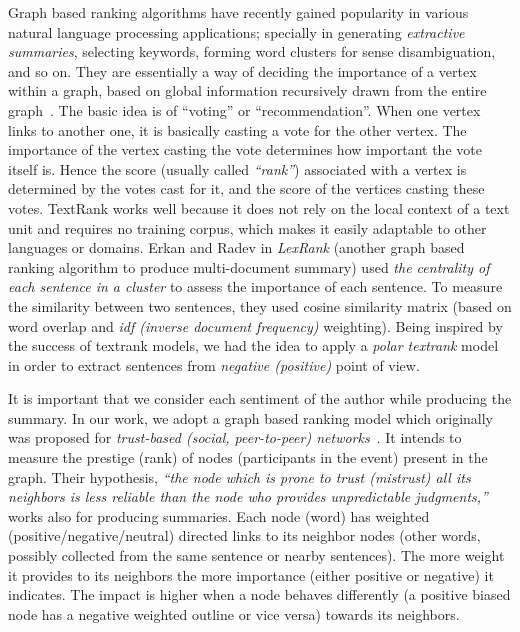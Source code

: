 \documentclass[a4paper]{report}
\begin{document}
\par Graph based ranking algorithms have recently gained popularity in various natural language processing applications; specially in generating {\em extractive summaries}, selecting keywords, forming word clusters for sense disambiguation, and so on. They are essentially a way of deciding the importance of a vertex within a graph, based on global information recursively drawn from the entire graph~\cite{Mihalcea04TextRank}. The basic idea is of ``voting'' or ``recommendation''. When one vertex links to another one, it is basically casting a vote for the other vertex. The importance of the vertex casting the vote determines how important the vote itself is.  Hence the score (usually called {\em ``rank''}) associated with a vertex is determined by the votes cast for it, and the score of the vertices casting these votes. TextRank works well because it does not rely on the local context of a text unit and requires no training corpus, which makes it easily adaptable to other languages or domains. Erkan and Radev \cite{Erkan:2004:LGL:1622487.1622501} in \emph{LexRank} (another graph based ranking algorithm to produce multi-document summary) used \emph{the centrality of each sentence in a cluster} to assess the importance of each sentence. To measure the similarity between two sentences, they used cosine similarity matrix (based on word overlap and {\em idf (inverse document frequency)} weighting). Being inspired by the success of textrank models, we had the idea to apply a {\em polar textrank} model in order to extract sentences from {\em negative (positive)} point of view.
\par It is important that we consider each sentiment of the author while producing the summary. In our work, we adopt a graph based ranking model which originally was proposed for {\em trust-based (social, peer-to-peer) networks}~\cite{Mishra:2011:FBP:1963405.1963485}. It intends to measure the prestige (rank) of nodes (participants in the event) present in the graph. Their hypothesis, {\em ``the node which is prone to trust (mistrust) all its neighbors is less reliable than the node who provides unpredictable judgments,''} works also for producing summaries. Each node (word) has weighted (positive/negative/neutral) directed links to its neighbor nodes (other words, possibly collected from the same sentence or nearby sentences). The more weight it provides to its neighbors the more importance (either positive or negative) it indicates. The impact is higher when a node behaves differently (a positive biased node has a negative weighted outline or vice versa) towards its neighbors. 
\end{document}
